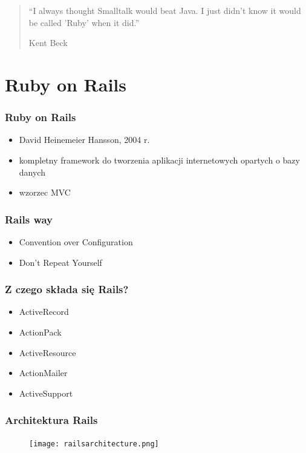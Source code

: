\documentclass[12t]{beamer}
\begin{document}
\begin{frame}
  \begin{quote}
    “I always thought Smalltalk would beat Java. I just
    didn't know it would be called 'Ruby' when it did.”

    \hfill Kent Beck
  \end{quote}
\end{frame}

\section{Ruby on Rails}
\begin{frame}
  \frametitle{Ruby on Rails}
  \begin{itemize}
  \item David Heinemeier Hansson, 2004 r.
  \item kompletny framework do tworzenia aplikacji internetowych
    opartych o bazy danych
  \item wzorzec MVC
  \end{itemize}
\end{frame}

\begin{frame}
  \frametitle{Rails way}
  \begin{itemize}
  \item Convention over Configuration
  \item Don't Repeat Yourself
  \end{itemize}
\end{frame}

\begin{frame}
  \frametitle{Z czego składa się Rails?}
  \begin{itemize}
  \item ActiveRecord
  \item ActionPack
  \item ActiveResource
  \item ActionMailer
  \item ActiveSupport
  \end{itemize}
\end{frame}

\begin{frame}
  \frametitle{Architektura Rails}
  \begin{figure}
    \centering
    \texttt{[image: railsarchitecture.png]}
  \end{figure}
\end{frame}
\end{document}
